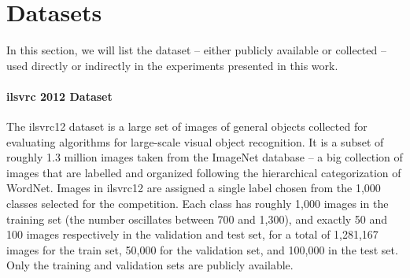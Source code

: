 \section{Datasets}
\label{sec:back:datasets}
In this section, we will list the dataset -- either publicly available or collected -- used directly or indirectly in the experiments presented in this work.

\paragraph{\acrfull{ilsvrc} 2012 Dataset}
The \gls{ilsvrc}12 dataset is a large set of images of general objects collected for evaluating algorithms for large-scale visual object recognition.
It is a subset of roughly 1.3 million images taken from the ImageNet database -- a big collection of images that are labelled and organized following the hierarchical categorization of WordNet.
Images in \gls{ilsvrc}12 are assigned a single label chosen from the 1,000 classes selected for the competition.
Each class has roughly 1,000 images in the training set (the number oscillates between 700 and 1,300), and exactly 50 and 100 images respectively in the validation and test set, for a total of 1,281,167 images for the train set, 50,000 for the validation set, and 100,000 in the test set.
Only the training and validation sets are publicly available.


